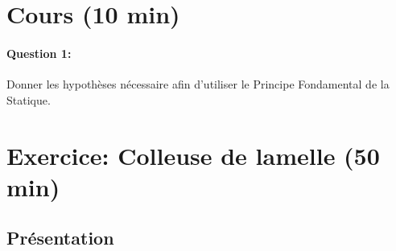 

\section{Cours (10 min)}

\paragraph{Question 1:} Donner les hypothèses nécessaire afin d'utiliser le Principe Fondamental de la Statique.

\reponse[3]

\section{Exercice: Colleuse de lamelle (50 min)}

\subsection{Présentation}

